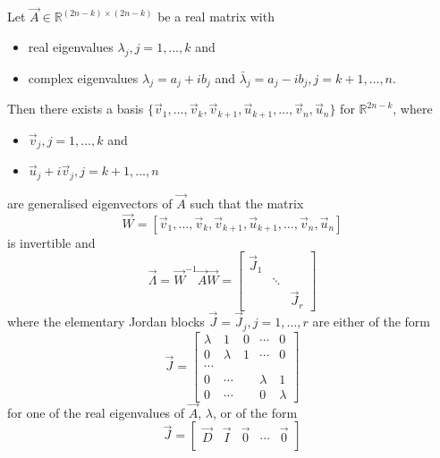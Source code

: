 \begin{theorem} %
	\label{thm:la:jordan}
	Let $\vec A \in \mathbb R^{(2n - k) \times (2n - k)}$ be a real matrix with
	\begin{itemize}
		\item real eigenvalues $\lambda_j, j = 1, \dotsc, k$ and
		\item complex eigenvalues $\lambda_j = a_j + ib_j$ and $\bar \lambda_j = a_j - ib_j, j = k + 1, \dotsc, n$.
	\end{itemize}
	Then there exists a basis $\{\vec v_1, \dotsc, \vec v_k, \vec v_{k + 1}, \vec u_{k + 1}, \dotsc, \vec v_n, \vec u_n\}$ for $\mathbb R^{2n - k}$, where
	\begin{itemize}
		\item $\vec v_j, j = 1, \dotsc, k$ and
		\item $\vec u_j + i\vec v_j, j = k + 1, \dotsc, n$
	\end{itemize}
	are generalised eigenvectors of $\vec A$ such that the matrix
	\begin{equation*}
		\vec W = [\vec v_1, \dotsc, \vec v_k, \vec v_{k + 1}, \vec u_{k + 1}, \dotsc, \vec v_n, \vec u_n]
	\end{equation*}
	is invertible and
	\begin{equation}
		\vec \Lambda = 
		\vec W^{-1} \vec A \vec W =
		\begin{bmatrix}
			\vec J_1 	& 			& \\
						& \ddots 	& \\
						&			& \vec J_r
		\end{bmatrix}
	\end{equation}
	where the elementary Jordan blocks $\vec J = \vec J_j, j = 1, \dotsc, r$ are either of the form
	\begin{equation}
		\vec J =
		\begin{bmatrix}
			\lambda & 1 		& 0 & \cdots 	& 0 \\
			0 		& \lambda 	& 1 & \cdots 	& 0 \\
			\cdots 	&			&	&		 	& \\
			0 		& \cdots 	& 	& \lambda 	& 1 \\
			0 		& \cdots	&	& 0 		& \lambda
		\end{bmatrix}
	\end{equation}
	for one of the real eigenvalues of $\vec A$, $\lambda$, or of the form
	\begin{equation}
		\vec J =
		\begin{bmatrix}
			\vec D 	& \vec I	& \vec 0 	& \cdots 	& \vec 0 \\

\end{bmatrix}
\end{equation}
\end{theorem}
